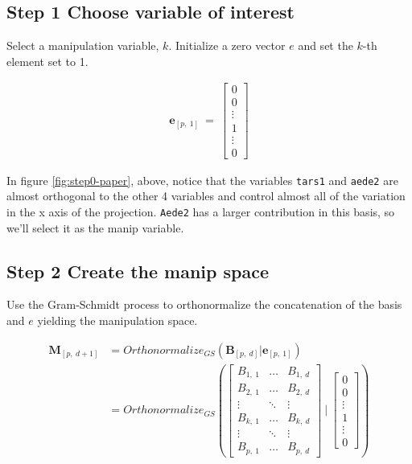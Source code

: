 \documentclass{monashthesis}
\begin{document}
\subsection{Step 1 Choose variable of
interest}\label{step-1-choose-variable-of-interest-1}

Select a manipulation variable, \(k\). Initialize a zero vector \(e\)
and set the \(k\)-th element set to 1.

\begin{align*}
\textbf{e}_{[p,~1]} ~=~
  \begin{bmatrix}
    0 \\
    0 \\
    \vdots \\
    1 \\
    \vdots \\
    0
  \end{bmatrix}
\end{align*}

In figure \ref{fig:step0-paper}, above, notice that the variables
\texttt{tars1} and \texttt{aede2} are almost orthogonal to the other 4
variables and control almost all of the variation in the x axis of the
projection. \texttt{Aede2} has a larger contribution in this basis, so
we'll select it as the manip variable.

\subsection{Step 2 Create the manip
space}\label{step-2-create-the-manip-space-1}

Use the Gram-Schmidt process to orthonormalize the concatenation of the
basis and \(e\) yielding the manipulation space.

\begin{align*}
  \textbf{M}_{[p,~d+1]}
  &= Orthonormalize_{GS}( \textbf{B}_{[p,~d]}|\textbf{e}_{[p,~1]} ) \\
  &= Orthonormalize_{GS}
  \left(
    \begin{bmatrix}
      B_{1,~1} & \dots  & B_{1,~d} \\
      B_{2,~1} & \dots  & B_{2,~d} \\
      \vdots   & \ddots & \vdots   \\
      B_{k,~1} & \dots  & B_{k,~d} \\
      \vdots   & \ddots & \vdots   \\
      B_{p,~1} & \dots  & B_{p,~d}
    \end{bmatrix}
  ~|~
    \begin{bmatrix}
      0 \\
      0 \\
      \vdots \\
      1 \\
      \vdots \\
      0
    \end{bmatrix}
  \right)
\end{align*}
\end{document}
